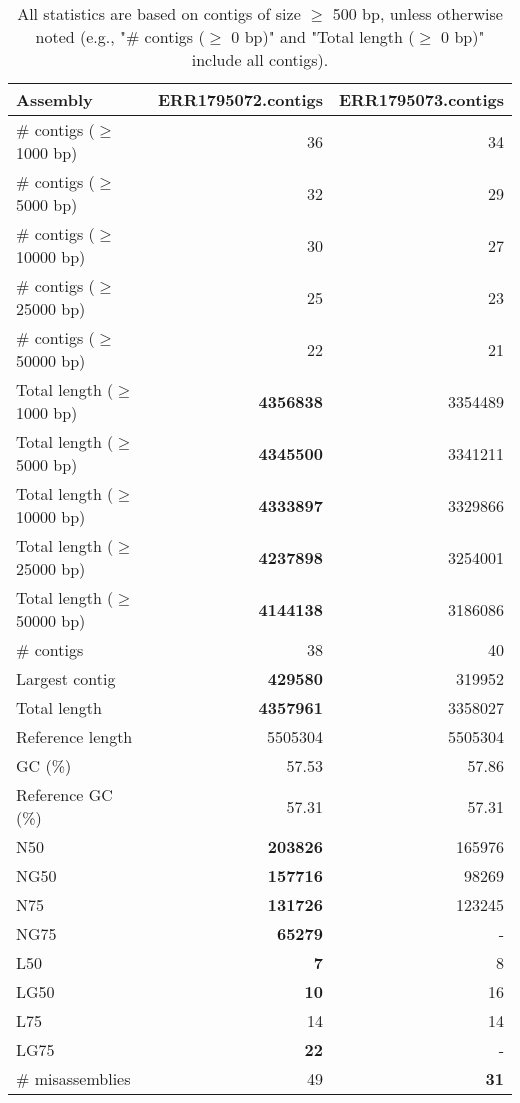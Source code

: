 \documentclass[12pt,a4paper]{article}
\begin{document}
\begin{table}[ht]
\begin{center}
\caption{All statistics are based on contigs of size $\geq$ 500 bp, unless otherwise noted (e.g., "\# contigs ($\geq$ 0 bp)" and "Total length ($\geq$ 0 bp)" include all contigs).}
\begin{tabular}{|l*{2}{|r}|}
\hline
Assembly & ERR1795072.contigs & ERR1795073.contigs \\ \hline
\# contigs ($\geq$ 1000 bp) & 36 & 34 \\ \hline
\# contigs ($\geq$ 5000 bp) & 32 & 29 \\ \hline
\# contigs ($\geq$ 10000 bp) & 30 & 27 \\ \hline
\# contigs ($\geq$ 25000 bp) & 25 & 23 \\ \hline
\# contigs ($\geq$ 50000 bp) & 22 & 21 \\ \hline
Total length ($\geq$ 1000 bp) & {\bf 4356838} & 3354489 \\ \hline
Total length ($\geq$ 5000 bp) & {\bf 4345500} & 3341211 \\ \hline
Total length ($\geq$ 10000 bp) & {\bf 4333897} & 3329866 \\ \hline
Total length ($\geq$ 25000 bp) & {\bf 4237898} & 3254001 \\ \hline
Total length ($\geq$ 50000 bp) & {\bf 4144138} & 3186086 \\ \hline
\# contigs & 38 & 40 \\ \hline
Largest contig & {\bf 429580} & 319952 \\ \hline
Total length & {\bf 4357961} & 3358027 \\ \hline
Reference length & 5505304 & 5505304 \\ \hline
GC (\%) & 57.53 & 57.86 \\ \hline
Reference GC (\%) & 57.31 & 57.31 \\ \hline
N50 & {\bf 203826} & 165976 \\ \hline
NG50 & {\bf 157716} & 98269 \\ \hline
N75 & {\bf 131726} & 123245 \\ \hline
NG75 & {\bf 65279} & - \\ \hline
L50 & {\bf 7} & 8 \\ \hline
LG50 & {\bf 10} & 16 \\ \hline
L75 & 14 & 14 \\ \hline
LG75 & {\bf 22} & - \\ \hline
\# misassemblies & 49 & {\bf 31} \\ \hline

\end{tabular}
\end{center}
\end{table}
\end{document}
